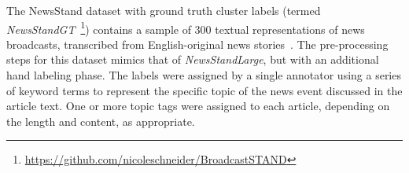 The NewsStand dataset with ground truth cluster labels (termed \emph{NewsStandGT}~\footnote{\url{https://github.com/nicoleschneider/BroadcastSTAND}}) contains a sample of 300 textual representations of news broadcasts, transcribed from English-original news stories~\cite{Zhang2023}.
The pre-processing steps for this dataset mimics that of \emph{NewsStandLarge}, but with an additional hand labeling phase.
The labels were assigned by a single annotator using a series of keyword terms to represent the specific topic of the news event discussed in the article text.
One or more topic tags were assigned to each article, depending on the length and content, as appropriate.

